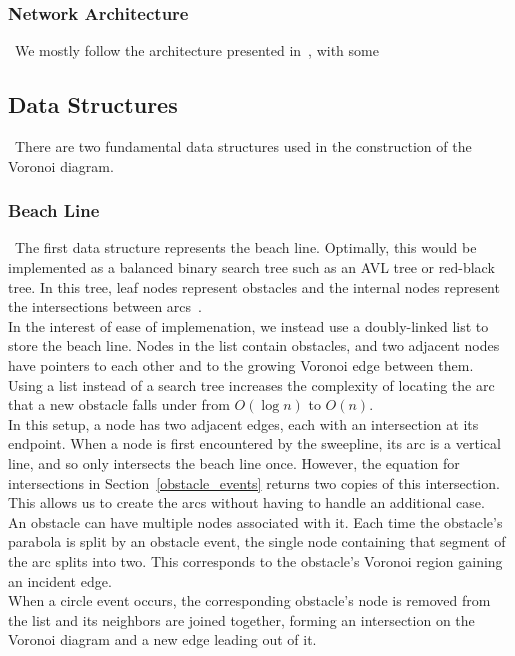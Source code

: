 \documentclass[conference]{IEEEtran}
\begin{document}
\subsubsection{Network Architecture}
\noindent\ We mostly follow the architecture presented
in~\cite{mnih2013playing}, with some 


\subsection{Data Structures}
\noindent\ There are two fundamental data structures used in the construction of the Voronoi
diagram.

\subsubsection{Beach Line}
\noindent\ The first data structure represents the beach line. Optimally,
this would be implemented as a balanced binary search tree such as an AVL tree or
red-black tree. In this tree, leaf nodes represent obstacles and
the internal nodes represent the intersections between arcs~\cite{mitslides}.\\
\indent In the interest of ease of implemenation, we instead use a
doubly-linked list to store the beach line. Nodes in the list contain
obstacles, and two adjacent nodes have pointers to each other and to the
growing Voronoi edge between them. Using a list instead of a search tree
increases the complexity of locating the arc that a new obstacle falls under
from $O(\log n)$ to $O(n)$.\\
\indent In this setup, a node has two adjacent edges, each with an intersection
at its endpoint. When a node is first encountered by the sweepline, its arc is a
vertical line, and so only intersects the beach line once. However, the equation
for intersections in Section~\ref{obstacle_events} returns two copies of this
intersection. This allows us to create the arcs without having to handle an
additional case.\\
\indent An obstacle can have multiple nodes associated with it. Each time the
obstacle's parabola is split by an obstacle event, the single node containing
that segment of the arc splits into two. This corresponds to the obstacle's
Voronoi region gaining an incident edge.\\
\indent When a circle event occurs, the corresponding obstacle's node is removed
from the list and its neighbors are joined together, forming an intersection on the
Voronoi diagram and a new edge leading out of it.
\end{document}
